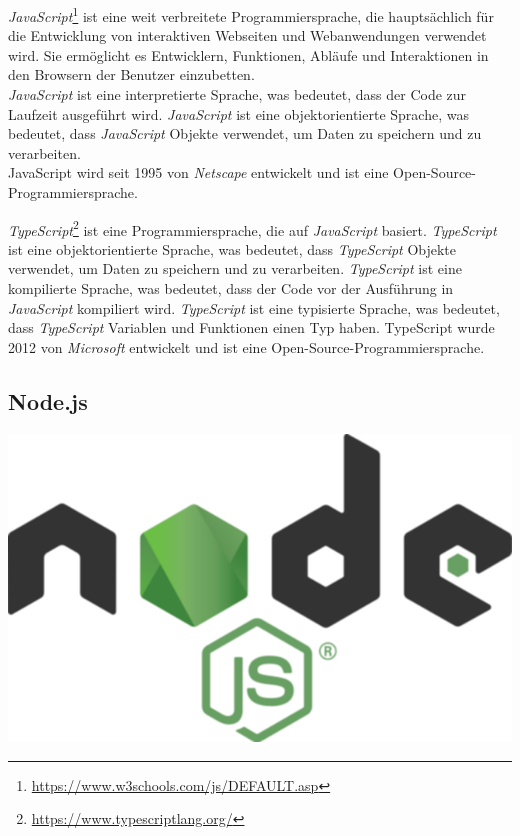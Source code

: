 
\emph{JavaScript}\footnote{\url{https://www.w3schools.com/js/DEFAULT.asp}} ist eine weit verbreitete Programmiersprache, die hauptsächlich für die Entwicklung von interaktiven Webseiten und Webanwendungen verwendet wird. Sie ermöglicht es Entwicklern, Funktionen, Abläufe und Interaktionen in den Browsern der Benutzer einzubetten. \\
\emph{JavaScript} ist eine interpretierte Sprache, was bedeutet, dass der Code zur Laufzeit ausgeführt wird. \emph{JavaScript} ist eine objektorientierte Sprache, was bedeutet, dass \emph{JavaScript} Objekte verwendet, um Daten zu speichern und zu verarbeiten. \\
JavaScript wird seit 1995 von \emph{Netscape} entwickelt und ist eine Open-Source-Programmiersprache.

\emph{TypeScript}\footnote{\url{https://www.typescriptlang.org/}} ist eine Programmiersprache, die auf \emph{JavaScript} basiert.
\emph{TypeScript} ist eine objektorientierte Sprache, was bedeutet, dass \emph{TypeScript} Objekte verwendet, um Daten zu speichern und zu verarbeiten.
\emph{TypeScript} ist eine kompilierte Sprache, was bedeutet, dass der Code vor der Ausführung in \emph{JavaScript} kompiliert wird.
\emph{TypeScript} ist eine typisierte Sprache, was bedeutet, dass \emph{TypeScript} Variablen und Funktionen einen Typ haben.
TypeScript wurde 2012 von \emph{Microsoft} entwickelt und ist eine Open-Source-Programmiersprache.
\newpage

\subsection{Node.js}\label{subsec:node.js}
\includegraphics[scale=0.1]{assets/nodejs}

